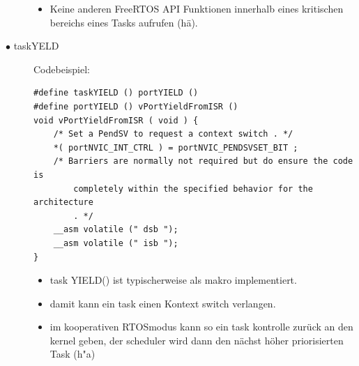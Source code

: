 \documentclass[a4paper, 8pt]{extarticle}
\begin{document}
\begin{multicols*}{3}
\begin{description}
\begin{itemize}
							\item Keine anderen FreeRTOS API Funktionen innerhalb eines kritischen bereichs eines Tasks aufrufen (hä).
						\end{itemize}
					\item[$\bullet$ taskYELD]
					Codebeispiel: 
						\begin{lstlisting}
#define taskYIELD () portYIELD ()
#define portYIELD () vPortYieldFromISR ()
void vPortYieldFromISR ( void ) {
	/* Set a PendSV to request a context switch . */
	*( portNVIC_INT_CTRL ) = portNVIC_PENDSVSET_BIT ;
	/* Barriers are normally not required but do ensure the code is
		completely within the specified behavior for the architecture
		. */
	__asm volatile (" dsb ");
	__asm volatile (" isb ");
}
						\end{lstlisting}
						\begin{itemize}
							\item task YIELD() ist typischerweise als makro implementiert. 
							\item damit kann ein task einen Kontext switch verlangen.
							\item im kooperativen RTOSmodus kann so ein task kontrolle zurück an den kernel geben, der scheduler wird dann
								  den nächst höher priorisierten Task (h"a)
						\end{itemize}

				\end{description}

\end{multicols*}
\end{document}
